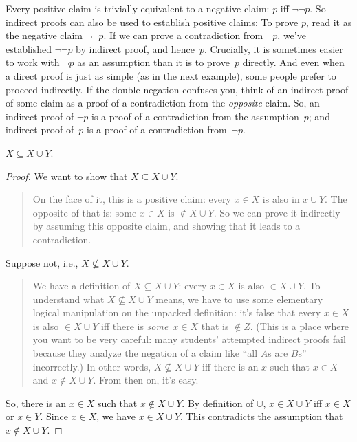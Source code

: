 \documentclass[../../../include/open-logic-section]{subfiles}
\begin{document}
Every positive claim is trivially equivalent to a negative claim: $p$
iff $\lnot\lnot p$.  So indirect proofs can also be used to establish
positive claims: To prove $p$, read it as the negative claim
$\lnot\lnot p$. If we can prove a contradiction from $\lnot p$, we've
established $\lnot\lnot p$ by indirect proof, and
hence~$p$. Crucially, it is sometimes easier to work with $\lnot p$ as
an assumption than it is to prove~$p$ directly.  And even when a
direct proof is just as simple (as in the next example), some people
prefer to proceed indirectly.  If the double negation confuses you,
think of an indirect proof of some claim as a proof of a contradiction
from the \emph{opposite} claim. So, an indirect proof of $\lnot p$ is a proof
of a contradiction from the assumption~$p$; and indirect proof of~$p$
is a proof of a contradiction from~$\lnot p$.

\begin{prop}
$X \subseteq X \cup Y$.
\end{prop}

\begin{proof}
  We want to show that $X \subseteq X \cup Y$.
  \begin{quote}
    On the face of it, this is a positive claim: every $x \in X$ is
    also in $x \cup Y$.  The opposite of that is: some $x \in X$ is
    $\notin X \cup Y$. So we can prove it indirectly by assuming this
    opposite claim, and showing that it leads to a contradiction.
    \end{quote}
  Suppose not, i.e., $X \nsubseteq X \cup Y$.
  \begin{quote}
    We have a definition of $X \subseteq X \cup Y$: every $x \in X$ is
    also $\in X \cup Y$.  To understand what $X \nsubseteq X \cup Y$
    means, we have to use some elementary logical manipulation on the
    unpacked definition: it's false that every $x \in X$ is also $\in
    X \cup Y$ iff there is \emph{some}~$x \in X$ that is $\notin Z$.
    (This is a place where you want to be very careful: many students'
    attempted indirect proofs fail because they analyze the negation
    of a claim like ``all $A$s are $B$s'' incorrectly.) In other
    words, $X \nsubseteq X \cup Y$ iff there is an $x$ such that $x
    \in X$ and $x \notin X \cup Y$. From then on, it's easy.
  \end{quote}
  So, there is an $x \in X$ such that $x \notin X \cup Y$.  By
  definition of $\cup$, $x \in X \cup Y$ iff $x \in X$ or $x \in
  Y$. Since $x \in X$, we have $x \in X \cup Y$. This contradicts the
  assumption that $x \notin X \cup Y$. 
\end{proof}
\end{document}
